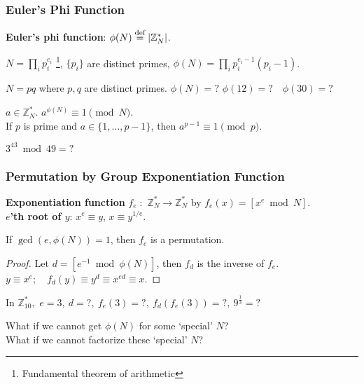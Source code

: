 \begin{frame}\frametitle{Euler's Phi Function}
\textbf{Euler's phi function}: $\phi(N) \overset{\text{def}}{=} \lvert\mathbb{Z}_N^*\rvert$.
\begin{theorem}
$N = \prod_ip_i^{e_i}$ \footnote{Fundamental theorem of arithmetic}, $\{p_i\}$ are distinct primes, $\phi(N) = \prod_ip_i^{e_i-1}(p_i-1)$.
\end{theorem}
\begin{exampleblock}{$N=pq$ where $p,q$ are distinct primes. $\phi(N)=?$ $\phi(12)=?\quad \phi(30)=?$}
\end{exampleblock}
\begin{corollary}
$a \in \mathbb{Z}_N^*$. $a^{\phi (N)} \equiv 1 \pmod N$.\\
If $p$ is prime and $a \in \{1,\dotsc,p-1\}$, then $a^{p-1} \equiv 1 \pmod p$.
\end{corollary}
\begin{exampleblock}{$3^{43} \bmod 49 = ?$}
\end{exampleblock}
\end{frame}
\begin{frame}\frametitle{Permutation by Group Exponentiation Function}
\textbf{Exponentiation function} $f_e\;:$ $\mathbb{Z}^*_N \to \mathbb{Z}^*_N$ by $f_e(x) =[x^e \bmod N]$.\\
\textbf{$e$'th root of $y$}: $x^e \equiv y$, $x \equiv y^{1/e}$. 
\begin{corollary}
If $\gcd(e,\phi(N))=1$, then $f_e$ is a permutation.
\end{corollary}
\begin{proof}
Let $d = [e^{-1} \bmod \phi(N)]$, then $f_d$ is the inverse of $f_e$.\\
$y \equiv x^{e};\quad f_{d}(y) \equiv y^d \equiv x^{ed} \equiv x$. 
\end{proof}
\begin{exampleblock}{In $\mathbb{Z}^*_{10}$,\ $e = 3,\ d = ?,\ f_{e}(3) = ?,\ f_{d}(f_{e}(3)) = ?,\ 9^{\frac{1}{3}} = ?$}
\end{exampleblock}
\begin{alertblock}{What if we cannot get $\phi(N)$ for some `special' $N$?\\
What if we cannot factorize these `special' $N$?}
\end{alertblock}
\end{frame}
